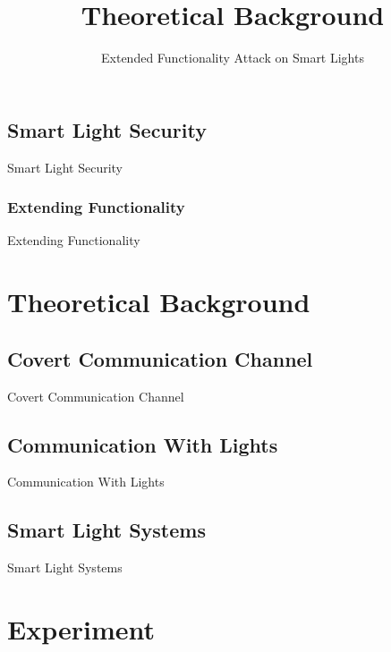 \documentclass[11pt,t,usepdftitle=false,aspectratio=169]{beamer}
\begin{document}
\subsection{Smart Light Security} %
\label{sub:smart_light_security}
\begin{frame}{Smart Light Security}

\end{frame}

\subsubsection{Extending Functionality} %
\label{subsub:extending}
\begin{frame}{Extending Functionality}
	
\end{frame}


\section{Theoretical Background} %
\label{sec:theory}
\title{Theoretical Background}
\subtitle{Extended Functionality Attack on Smart Lights}

\subsection{Covert Communication Channel} %
\label{sub:covert_channel}
\begin{frame}{Covert Communication Channel}

\end{frame}

\subsection{Communication With Lights} %
\label{sub:light_communication}
\begin{frame}{Communication With Lights}

\end{frame}

\subsection{Smart Light Systems} %
\label{sub:smart_lights}
\begin{frame}{Smart Light Systems}
  
\end{frame}

\section{Experiment}%
\label{sec:experiment}
\end{document}
